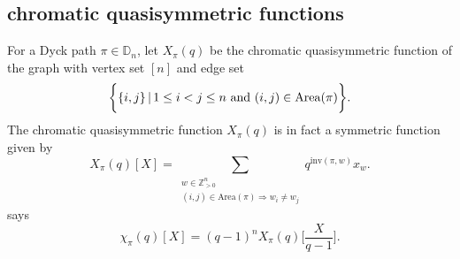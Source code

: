 \documentclass[12pt,reqno]{amsart}
\theoremstyle{plain}
\theoremstyle{definition}
\theoremstyle{remark}
\theoremstyle{example}
\numberwithin{equation}{section}
\newcommand\ZZ{\mathbb{Z}}
\newcommand\inv{\mathrm{inv}}
\newcommand{\Area}{\mathrm{Area}}
\newcommand{\DD}{\mathbb{D}}
\begin{document}
 

\subsection{chromatic quasisymmetric functions}

For a Dyck path $\pi \in \DD_n$, let $X_\pi(q)$ be the chromatic quasisymmetric function of the graph with vertex set $[n]$ and edge set $$ \bigg\{\{i,j\}\,|\, 1 \leq i<j \leq n \hbox{ and } (i,j) \in \Area(\pi)\bigg\}.$$ The chromatic quasisymmetric function $X_\pi(q)$ is in fact a symmetric function given by $$ X_\pi(q)[X] = \sum_{\substack{w \in \ZZ_{>0}^n \\ (i,j) \in \Area(\pi) \Rightarrow w_i \neq w_j}} q^{\inv(\pi,w)} x_w. $$
\cite[Proposition 3.5]{Carlsson-Mellit-Shuffle} says \begin{equation}\label{eq:chromaticLLTplethysmrel}
	\chi_\pi(q)[X] = (q-1)^n X_\pi(q)\bigg[ \dfrac{X}{q-1} \bigg].
\end{equation} 








%
%
%
%
%
%
\end{document}
